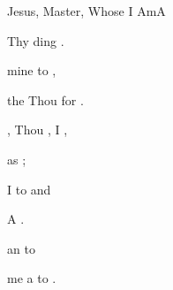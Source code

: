 \documentclass[12pt]{book}
\begin{document}
\begin{song}{Jesus, Master, Whose I Am}{A}
\begin{SBExtraKeys}
{\begin{SBVerse}
     Thy ding  .

      mine  to ,

     the  Thou  for .
    \end{SBVerse}

    \begin{SBVerse}
    , Thou  , I ,

      as   ;

     I  to  and 

     A   .

     an   to 

     me  a  to .
    \end{SBVerse}


}\end{SBExtraKeys}
\end{song}
\end{document}
